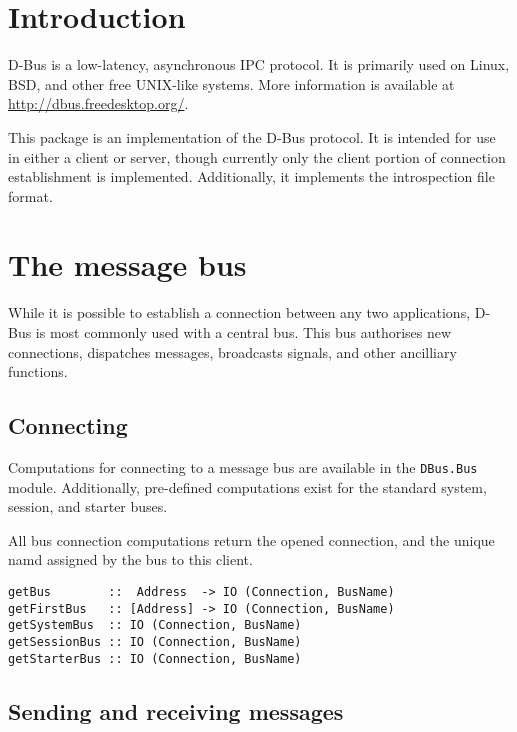 \documentclass[12pt]{article}
\begin{document}
\tableofcontents

\section{Introduction}

D-Bus is a low-latency, asynchronous IPC protocol. It is primarily used on
Linux, BSD, and other free UNIX-like systems. More information is available
at \url{http://dbus.freedesktop.org/}.

This package is an implementation of the D-Bus protocol. It is intended
for use in either a client or server, though currently only the client
portion of connection establishment is implemented. Additionally, it
implements the introspection file format.

\section{The message bus}

While it is possible to establish a connection between any two applications,
D-Bus is most commonly used with a central bus. This bus authorises new
connections, dispatches messages, broadcasts signals, and other ancilliary
functions.

\subsection{Connecting}

Computations for connecting to a message bus are available in the
{\tt DBus.Bus} module. Additionally, pre-defined computations exist for the
standard {\sc system}, {\sc session}, and {\sc starter} buses.

All bus connection computations return the opened connection, and the
unique namd assigned by the bus to this client.

\begin{verbatim}
getBus        ::  Address  -> IO (Connection, BusName)
getFirstBus   :: [Address] -> IO (Connection, BusName)
getSystemBus  :: IO (Connection, BusName)
getSessionBus :: IO (Connection, BusName)
getStarterBus :: IO (Connection, BusName)
\end{verbatim}

\subsection{Sending and receiving messages}
\end{document}
